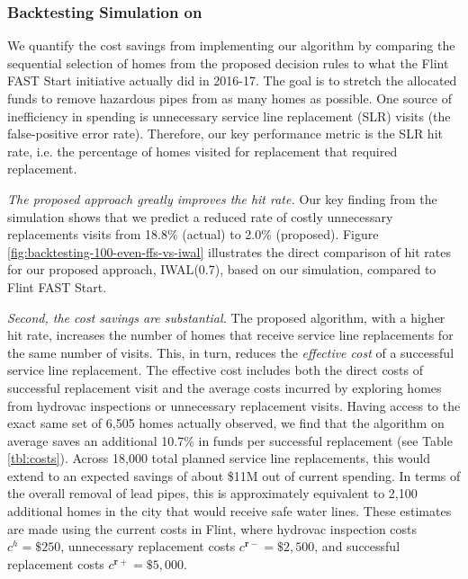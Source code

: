 \documentclass[sigconf]{acmart}
\newcommand{\replace}{\mathbf{r}}
\begin{document}
\subsubsection{Backtesting Simulation on \ActualFlint}

We quantify the cost savings from implementing our algorithm by comparing the sequential selection of homes from the proposed decision rules to what the Flint FAST Start initiative actually did in 2016-17. %
The goal is to stretch the allocated funds to remove hazardous pipes from as many homes as possible. One source of inefficiency in spending is unnecessary service line replacement (SLR) visits (the false-positive error rate). Therefore, our key performance metric is the SLR hit rate, i.e. the percentage of homes visited for replacement that required replacement.


\emph{The proposed approach greatly improves the hit rate.} Our key finding from the simulation shows that we predict a reduced rate of costly unnecessary replacements visits from 18.8\% (actual) to 2.0\% (proposed). Figure \ref{fig:backtesting-100-even-ffs-vs-iwal} illustrates the direct comparison of hit rates for our proposed approach, \textsc{IWAL}(0.7), based on our \ActualFlint simulation, compared to Flint FAST Start. %
 

\emph{Second, the cost savings are substantial.} The proposed algorithm, with a higher hit rate, increases the number of homes that receive service line replacements for the same number of visits. This, in turn, reduces the \emph{effective cost} of a successful service line replacement. The effective cost includes both the direct costs of successful replacement visit and the average costs incurred by exploring homes from hydrovac inspections or unnecessary replacement visits. Having access to the exact same set of 6,505 homes actually observed, we find that the algorithm on average saves an additional 10.7\% in funds per successful replacement (see Table \ref{tbl:costs}). Across 18,000 total planned service line replacements, this would extend to an expected savings of about \$11M out of current spending. In terms of the overall removal of lead pipes, this is approximately equivalent to 2,100 additional homes in the city that would receive safe water lines. These estimates are made using the current costs in Flint, where hydrovac inspection costs $c^h=\$250$, unnecessary replacement costs $c^{\replace-}=\$2,500$, and successful replacement costs $c^{\replace+}=\$5,000$.
\end{document}
